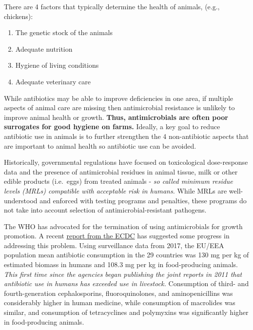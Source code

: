 \documentclass[
  11pt,
  paper=a4,
  ,captions=tableheading
]{scrartcl}
\providecommand{\tightlist}{%
  \setlength{\itemsep}{0pt}\setlength{\parskip}{0pt}}
\begin{document}
There are 4 factors that typically determine the health of animals,
(e.g., chickens):

\begin{enumerate}
\def\labelenumi{\arabic{enumi}.}
\tightlist
\item
  The genetic stock of the animals
\item
  Adequate nutrition
\item
  Hygiene of living conditions
\item
  Adequate veterinary care
\end{enumerate}

While antibiotics may be able to improve deficiencies in one area, if
multiple aspects of animal care are missing then antimicrobial
resistance is unlikely to improve animal health or growth. \textbf{Thus,
antimicrobials are often poor surrogates for good hygiene on farms.}
Ideally, a key goal to reduce antibiotic use in animals is to further
strengthen the 4 non-antibiotic aspects that are important to animal
health so antibiotic use can be avoided.

Historically, governmental regulations have focused on toxicological
dose-response data and the presence of antimicrobial residues in animal
tissue, milk or other edible products (i.e.~eggs) from treated animals -
\emph{so called minimum residue levels (MRLs) compatible with acceptable
risk in humans.} While MRLs are well-understood and enforced with
testing programs and penalties, these programs do not take into account
selection of antimicrobial-resistant pathogens.

The WHO has advocated for the termination of using antimicrobials for
growth promotion. A recent
\href{https://www.ecdc.europa.eu/sites/default/files/documents/JIACRA-III-Antimicrobial-Consumption-and-Resistance-in-Bacteria-from-Humans-and-Animals.pdf}{report
from the ECDC} has suggested some progress in addressing this problem.
Using surveillance data from 2017, the EU/EEA population mean antibiotic
consumption in the 29 countries was 130 mg per kg of estimated biomass
in humans and 108.3 mg per kg in food-producing animals. \emph{This
first time since the agencies began publishing the joint reports in 2011
that antibiotic use in humans has exceeded use in livestock.}
Consumption of third- and fourth-generation cephalosporins,
fluoroquinolones, and aminopenicillins was considerably higher in human
medicine, while consumption of macrolides was similar, and consumption
of tetracyclines and polymyxins was significantly higher in
food-producing animals.
\end{document}
